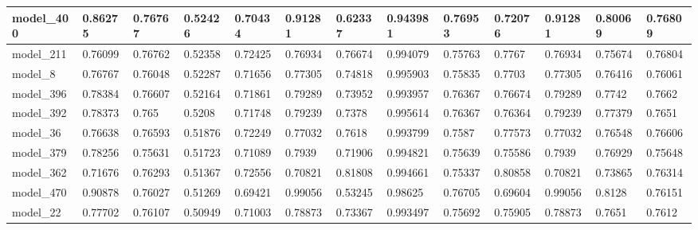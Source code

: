 \begin{tabular}{|l|l|l|l|l|l|l|l|l|l|l|l|l|}
model\_400     & 0.86275     & 0.76767        & 0.52426      & 0.70434          & 0.91281              & 0.62337              & 0.943981     & 0.76953           & 0.72076            & 0.91281         & 0.80069     & 0.76809      \\ \hline
model\_211     & 0.76099     & 0.76762        & 0.52358      & 0.72425          & 0.76934              & 0.76674              & 0.994079     & 0.75763           & 0.7767             & 0.76934         & 0.75674     & 0.76804      \\ \hline
model\_8       & 0.76767     & 0.76048        & 0.52287      & 0.71656          & 0.77305              & 0.74818              & 0.995903     & 0.75835           & 0.7703             & 0.77305         & 0.76416     & 0.76061      \\ \hline
model\_396     & 0.78384     & 0.76607        & 0.52164      & 0.71861          & 0.79289              & 0.73952              & 0.993957     & 0.76367           & 0.76674            & 0.79289         & 0.7742      & 0.7662       \\ \hline
model\_392     & 0.78373     & 0.765          & 0.5208       & 0.71748          & 0.79239              & 0.7378               & 0.995614     & 0.76367           & 0.76364            & 0.79239         & 0.77379     & 0.7651       \\ \hline
model\_36      & 0.76638     & 0.76593        & 0.51876      & 0.72249          & 0.77032              & 0.7618               & 0.993799     & 0.7587            & 0.77573            & 0.77032         & 0.76548     & 0.76606      \\ \hline
model\_379     & 0.78256     & 0.75631        & 0.51723      & 0.71089          & 0.7939               & 0.71906              & 0.994821     & 0.75639           & 0.75586            & 0.7939          & 0.76929     & 0.75648      \\ \hline
model\_362     & 0.71676     & 0.76293        & 0.51367      & 0.72556          & 0.70821              & 0.81808              & 0.994661     & 0.75337           & 0.80858            & 0.70821         & 0.73865     & 0.76314      \\ \hline
model\_470     & 0.90878     & 0.76027        & 0.51269      & 0.69421          & 0.99056              & 0.53245              & 0.98625      & 0.76705           & 0.69604            & 0.99056         & 0.8128      & 0.76151      \\ \hline
model\_22      & 0.77702     & 0.76107        & 0.50949      & 0.71003          & 0.78873              & 0.73367              & 0.993497     & 0.75692           & 0.75905            & 0.78873         & 0.7651      & 0.7612       \\ \hline

\end{tabular}
